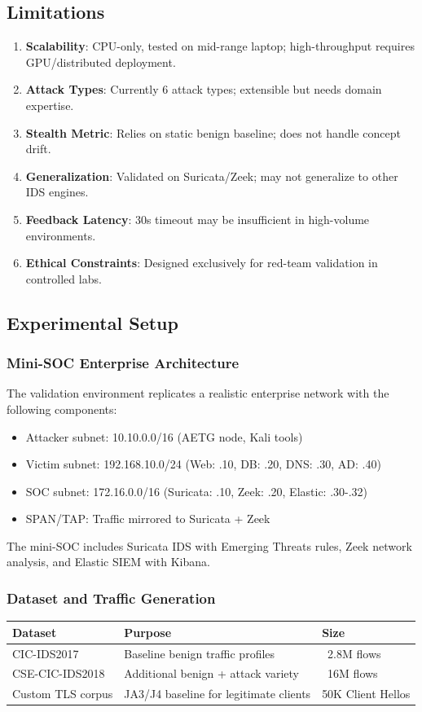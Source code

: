 \documentclass[review]{elsarticle}
\begin{document}
\subsection{Limitations}
\begin{enumerate}
\item \textbf{Scalability}: CPU-only, tested on mid-range laptop; high-throughput requires GPU/distributed deployment.
\item \textbf{Attack Types}: Currently 6 attack types; extensible but needs domain expertise.
\item \textbf{Stealth Metric}: Relies on static benign baseline; does not handle concept drift.
\item \textbf{Generalization}: Validated on Suricata/Zeek; may not generalize to other IDS engines.
\item \textbf{Feedback Latency}: 30s timeout may be insufficient in high-volume environments.
\item \textbf{Ethical Constraints}: Designed exclusively for red-team validation in controlled labs.
\end{enumerate}

\subsection{Experimental Setup}
\subsubsection{Mini-SOC Enterprise Architecture}
The validation environment replicates a realistic enterprise network with the following components:
\begin{itemize}
\item Attacker subnet: 10.10.0.0/16 (AETG node, Kali tools)
\item Victim subnet: 192.168.10.0/24 (Web: .10, DB: .20, DNS: .30, AD: .40)
\item SOC subnet: 172.16.0.0/16 (Suricata: .10, Zeek: .20, Elastic: .30-.32)
\item SPAN/TAP: Traffic mirrored to Suricata + Zeek
\end{itemize}
The mini-SOC includes Suricata IDS with Emerging Threats rules, Zeek network analysis, and Elastic SIEM with Kibana.

\subsubsection{Dataset and Traffic Generation}
\begin{table}[htbp]
\small
\centering
\renewcommand{\arraystretch}{1.2}
\begin{tabular}{|l|l|l|}
\hline
\textbf{Dataset} & \textbf{Purpose} & \textbf{Size} \\
\hline
CIC-IDS2017 \cite{sharafaldin2018toward} & Baseline benign traffic profiles & ~2.8M flows \\
CSE-CIC-IDS2018 & Additional benign + attack variety & ~16M flows \\
Custom TLS corpus & JA3/J4 baseline for legitimate clients & 50K Client Hellos \\
\hline
\end{tabular}
\end{table}
\end{document}
